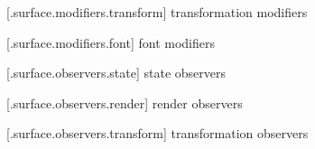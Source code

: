  [\iotwod.surface.modifiers.transform] { transformation modifiers}

%
%	
%	

 [\iotwod.surface.modifiers.font] { font modifiers}

%
%	
%	

 [\iotwod.surface.observers.state] { state observers}

%
%	
%	

 [\iotwod.surface.observers.render] { render observers}

%
%	
%	

 [\iotwod.surface.observers.transform] { transformation observers}

%
%	
%	

